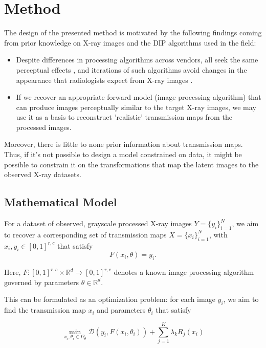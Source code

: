 \documentclass[nomenclature, english, bibtex]{kththesis}
\numberwithin{listing}{chapter}
\begin{document}
\chapter{Method}

The design of the presented method is motivated by the following findings coming from prior knowledge on X-ray images
and the \acrshort{DIP} algorithms used in the field:

\begin{itemize}
    \item Despite differences in processing algorithms across vendors, all seek the same perceptual effects
    \cite[p.~119]{carterDigitalRadiographyPACS2010}, and iterations of such algorithms avoid changes in the appearance
    that radiologists expect from X-ray images \cite[p.~57]{STA00a}.
    \item If we recover an appropriate forward model (image processing algorithm) that can produce images perceptually
    similar to the target X-ray images, we may use it as a basis to reconstruct 'realistic' transmission maps from
    the processed images.
\end{itemize}

Moreover, there is little to none prior information about transmission maps. Thus, if it's not possible to
design a model constrained on data, it might be possible to constrain it on the transformations that map the
latent images to the observed X-ray datasets.

\section{Mathematical Model}
\label{sec:mathematicalModel}

For a dataset of observed, grayscale processed X-ray images $Y = \{y_i\}^N_{i=1}$, we aim to recover a corresponding
set of transmission maps $X = \{x_i\}^N_{i=1}$, with $x_i, y_i \in [0, 1]^{r, c}$ that satisfy
\begin{equation}
    F(x_i, \theta) = y_i.
\end{equation}

Here, $F:[0,1]^{r, c} \times \mathbb{R}^d \to [0, 1]^{r, c}$ denotes a known image processing algorithm governed by
parameters $\theta \in \mathbb{R}^d$.

This can be formulated as an optimization problem: for each image $y_i$, we aim to find the transmission map $x_i$
and parameters $\theta_i$ that satisfy

\begin{equation}
    \label{eq:optimizationProblem}
    \min_{x_i, \theta_i \in \Omega_\theta}  \mathcal{D}(y_i, F(x_i, \theta_i)) + \sum_{j = 1}^{K} \lambda_k R_j(x_i)
\end{equation}
\end{document}
